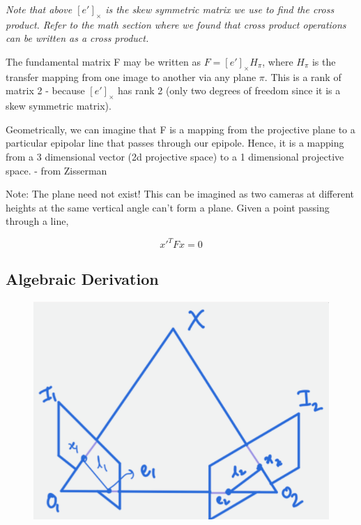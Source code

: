 \textit{Note that above $[e']_{\times}$ is the skew symmetric matrix we use to find the cross product. Refer to the math section where we found that cross product operations can be written as a cross product.}

The fundamental matrix F may be written as $F = [e']_{\times}H_{\pi}$, where $H_{\pi}$ is the transfer mapping from one image to another via any plane $\pi$. This is a rank of matrix 2 - because $[e']_{\times}$ has rank 2 (only two degrees of freedom since it is a skew symmetric matrix).

Geometrically, we can imagine that F is a mapping from the projective plane to a particular epipolar line that passes through our epipole. Hence, it is a mapping from a 3 dimensional vector (2d projective space) to a 1 dimensional projective space. - from Zisserman 

Note: The plane need not exist! This can be imagined as two cameras at different heights at the same vertical angle can't form a plane. Given a point passing through a line, 

\begin{equation}
    x'^TFx = 0
\end{equation}

\subsection{Algebraic Derivation}

\begin{figure}[h]
    \centering
    \includegraphics[width=12cm]{img/algebraic-fundamental.png}
    \caption{}
    \label{fig:Algebraic-fundamental}
\end{figure}

